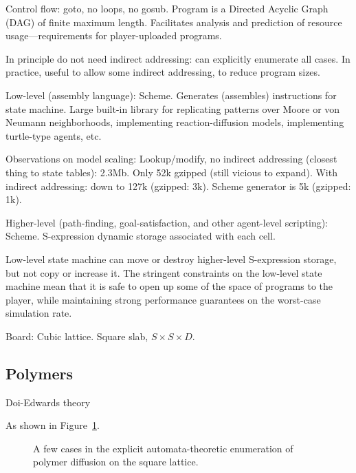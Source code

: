 \documentclass{acm_proc_article-sp}
\begin{document}
Control flow: goto, no loops, no gosub. Program is a Directed Acyclic Graph (DAG) of finite maximum length.
Facilitates analysis and prediction of resource usage---requirements for player-uploaded programs.

In principle do not need indirect addressing: can explicitly enumerate all cases.
In practice, useful to allow some indirect addressing, to reduce program sizes.

Low-level (assembly language):
Scheme. Generates (assembles) instructions for state machine.
Large built-in library for replicating patterns over Moore or von Neumann neighborhoods,
implementing reaction-diffusion models, implementing turtle-type agents, etc.

Observations on model scaling:
Lookup/modify, no indirect addressing (closest thing to state tables): 2.3Mb.
Only 52k gzipped (still vicious to expand).
With indirect addressing: down to 127k (gzipped: 3k).
Scheme generator is 5k (gzipped: 1k).


Higher-level (path-finding, goal-satisfaction, and other agent-level scripting):
Scheme. S-expression dynamic storage associated with each cell.

Low-level state machine can move or destroy higher-level S-expression storage, but not copy or increase it.
The stringent constraints on the low-level state machine mean that it is safe to open up some of the space of programs to the player,
while maintaining strong performance guarantees on the worst-case simulation rate.

Board:
Cubic lattice.
Square slab, $S \times S \times D$.


\subsection{Polymers}

Doi-Edwards theory \cite{DoiEdwards1988}

As shown in Figure~\ref{fig:polymer}.

\begin{figure}
\caption{
\label{fig:polymer}
A few cases in the explicit automata-theoretic enumeration of polymer diffusion on the square lattice.
}
\end{figure}
\end{document}

